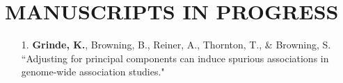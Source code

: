\documentclass[margin]{res}
\begin{document}
\begin{resume}
\begin{itemize}
\end{itemize}



\section{MANUSCRIPTS IN PROGRESS}
\begin{itemize}
\item[1.] \textbf{Grinde, K.}, Browning, B., Reiner, A., Thornton, T., \& Browning, S. ``Adjusting for principal components can induce spurious associations in genome-wide association studies."\\


\end{itemize}
\end{resume}
\end{document}
